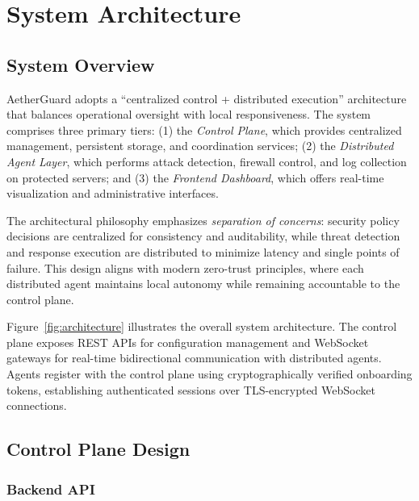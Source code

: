 
\section{System Architecture}
\label{sec:architecture}

\subsection{System Overview}
\label{subsec:overview}

AetherGuard adopts a ``centralized control + distributed execution'' architecture that balances operational oversight with local responsiveness. The system comprises three primary tiers: (1) the \textit{Control Plane}, which provides centralized management, persistent storage, and coordination services; (2) the \textit{Distributed Agent Layer}, which performs attack detection, firewall control, and log collection on protected servers; and (3) the \textit{Frontend Dashboard}, which offers real-time visualization and administrative interfaces.

The architectural philosophy emphasizes \textit{separation of concerns}: security policy decisions are centralized for consistency and auditability, while threat detection and response execution are distributed to minimize latency and single points of failure. This design aligns with modern zero-trust principles, where each distributed agent maintains local autonomy while remaining accountable to the control plane.

Figure~\cref{fig:architecture} illustrates the overall system architecture. The control plane exposes REST APIs for configuration management and WebSocket gateways for real-time bidirectional communication with distributed agents. Agents register with the control plane using cryptographically verified onboarding tokens, establishing authenticated sessions over TLS-encrypted WebSocket connections.

\subsection{Control Plane Design}
\label{subsec:control-plane}

\subsubsection{Backend API}

